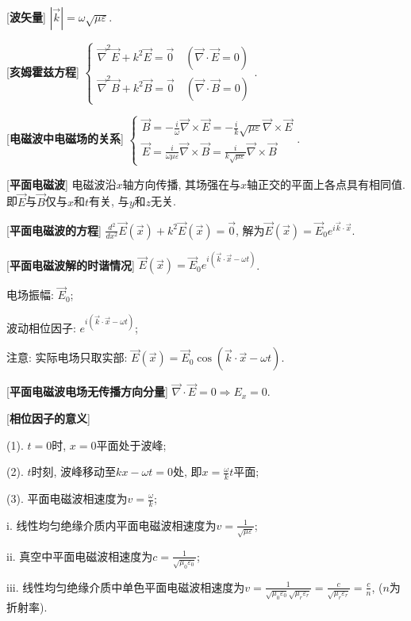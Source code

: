 [\textbf{波矢量}] $|\vec k|=\omega\sqrt{\mu\varepsilon}$.\par

[\textbf{亥姆霍兹方程}] $\begin{cases}\vec\nabla^2\vec E+k^2\vec E=\vec 0\quad (\vec\nabla\cdot\vec E=0)\\\vec\nabla^2\vec B+k^2\vec B=\vec 0\quad(\vec\nabla\cdot\vec B=0)\end{cases}$.\par

[\textbf{电磁波中电磁场的关系}] $\begin{cases}\vec B=-\frac{i}{\omega}\vec\nabla\times\vec E=-\frac{i}{k}\sqrt{\mu\varepsilon}\vec\nabla\times\vec E\\\vec E=\frac{i}{\omega\mu\varepsilon}\vec\nabla\times\vec B=\frac{i}{k\sqrt{\mu\varepsilon}}\vec\nabla\times\vec B\end{cases}$.\par

[\textbf{平面电磁波}] 电磁波沿$x$轴方向传播, 其场强在与$x$轴正交的平面上各点具有相同值. 即$\vec E$与$\vec B$仅与$x$和$t$有关, 与$y$和$z$无关.\par

\clearpage

[\textbf{平面电磁波的方程}] $\frac{d^2}{dx^2}\vec E(\vec x)+k^2\vec E(\vec x)=\vec0$, 解为$\vec E(\vec x)=\vec E_0e^{i\vec k\cdot\vec x}$.\par

[\textbf{平面电磁波解的时谐情况}] $\vec E(\vec x)=\vec E_0e^{i(\vec k\cdot\vec x-\omega t)}$.\par
\qquad 电场振幅: $\vec E_0$;\par
\qquad 波动相位因子: $e^{i(\vec k\cdot\vec x-\omega t)}$;\par
\qquad 注意: 实际电场只取实部: $\vec E(\vec x)=\vec E_0\cos{(\vec k\cdot\vec x-\omega t)}$.\par

[\textbf{平面电磁波电场无传播方向分量}] $\vec\nabla\cdot\vec E=0\Rightarrow E_x=0$.\par

[\textbf{相位因子的意义}]\par
\qquad (1). $t=0$时, $x=0$平面处于波峰;\par
\qquad (2). $t$时刻, 波峰移动至$kx-\omega t=0$处, 即$x=\frac{\omega}{k}t$平面;\par
\qquad (3). 平面电磁波相速度为$v=\frac{\omega}{k}$;\par
\qquad\qquad i. 线性均匀绝缘介质内平面电磁波相速度为$v=\frac{1}{\sqrt{\mu\varepsilon}}$;\par
\qquad\qquad ii. 真空中平面电磁波相速度为$c=\frac{1}{\sqrt{\mu_0\varepsilon_0}}$;\par
\qquad\qquad iii. 线性均匀绝缘介质中单色平面电磁波相速度为$v=\frac{1}{\sqrt{\mu_0\varepsilon_0}\sqrt{\mu_r\varepsilon_r}}=\frac{c}{\sqrt{\mu_r\varepsilon_r}}=\frac{c}{n}$, ($n$为折射率).\par

